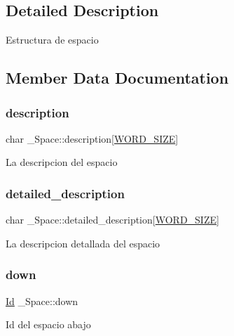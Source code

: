 \subsection{Detailed Description}
Estructura de espacio 

\subsection{Member Data Documentation}
\mbox{\label{struct__Space_a2a50aacb78d1d0f65f5b14f94ed81d80}} 
\subsubsection{\texorpdfstring{description}{description}}
{\footnotesize\ttfamily char \+\_\+\+Space\+::description\mbox{[}\hyperlink{types_8h_a92ed8507d1cd2331ad09275c5c4c1c89}{W\+O\+R\+D\+\_\+\+S\+I\+ZE}\mbox{]}}

La descripcion del espacio \mbox{\label{struct__Space_a5b0f12b84b11444282405bb6ae64f442}} 
\subsubsection{\texorpdfstring{detailed\+\_\+description}{detailed\_description}}
{\footnotesize\ttfamily char \+\_\+\+Space\+::detailed\+\_\+description\mbox{[}\hyperlink{types_8h_a92ed8507d1cd2331ad09275c5c4c1c89}{W\+O\+R\+D\+\_\+\+S\+I\+ZE}\mbox{]}}

La descripcion detallada del espacio \mbox{\label{struct__Space_ac20194f418676bb03cca7e0fdcb6f559}} 
\subsubsection{\texorpdfstring{down}{down}}
{\footnotesize\ttfamily \hyperlink{types_8h_a845e604fb28f7e3d97549da3448149d3}{Id} \+\_\+\+Space\+::down}

Id del espacio abajo \mbox{\label{struct__Space_a41ce2bf33cf0c157b358221f094ee05b}} 

